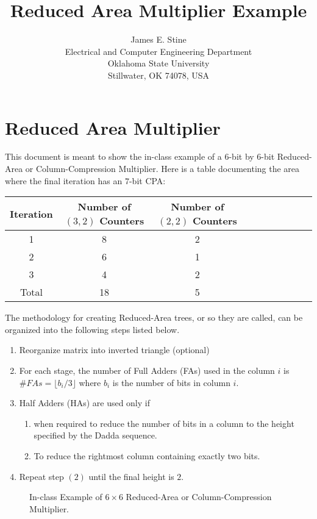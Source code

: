 \documentclass{article}
\begin{document}
\title{Reduced Area Multiplier Example}
\author{James E. Stine \\
Electrical and Computer Engineering Department\\
Oklahoma State University \\
Stillwater, OK 74078, USA}
\date{}

\maketitle

\section{Reduced Area Multiplier}
This document is meant to show the in-class example of a $6$-bit by $6$-bit
Reduced-Area or Column-Compression Multiplier.  
Here is
a table documenting the area where the final iteration has an $7$-bit CPA:
  \begin{table} [h]
    \centering
    \begin{tabular}{|c|c|c|c|c|c|c|c|c|c|} \hline
    Iteration & Number of $(3,2)$ Counters & Number of $(2,2)$ Counters \\
    \hline \hline
      1 & 8 & 2  \\ \hline
      2 & 6 & 1  \\ \hline
      3 & 4 & 2  \\ \hline \hline
  Total & 18 & 5 \\ \hline
    \end{tabular}
  \end{table}

The methodology
for creating Reduced-Area trees, or so they are called, can
be organized into the following steps listed below.  
\begin{enumerate}
\item Reorganize matrix into inverted triangle (optional)
\item For each stage, the number of Full Adders (FAs) used in the column $i$ is
  $\#FAs = \lfloor b_i/3 \rfloor$ where $b_i$ is the number of bits in column
  $i$.
\item Half Adders (HAs) are used only if
\begin{enumerate}
 \item when required to reduce the number of bits in a column to the height
  specified by the Dadda sequence.
 \item To reduce the rightmost column containing exactly two bits.
\end{enumerate}
\item Repeat step $(2)$ until the final height is $2$.
\end{enumerate}

  \begin{figure}
    \begin{center}
      \setlength{\unitlength}{0.0105in}%
    \end{center}
    \label{wallace6.fig}
    \caption{In-class Example of $6 \times 6$ Reduced-Area or Column-Compression Multiplier.}
  \end{figure}
\end{document}
